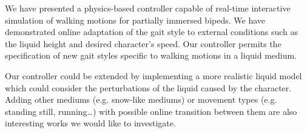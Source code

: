 \documentclass[conference]{acmsiggraph}
\begin{document}
We have presented a physics-based controller capable of real-time interactive simulation of walking motions for partially immersed bipeds. We have demonstrated online adaptation of the gait style to external conditions such as the liquid height and desired character's speed. Our controller permits the specification of new gait styles specific to walking motions in a liquid medium.

Our controller could be extended by implementing a more realistic liquid model which could consider the perturbations of the liquid caused by the character. Adding other mediums (e.g. snow-like mediums) or movement types (e.g. standing still, running…) with possible online transition between them are also interesting works we would like to investigate.




\end{document}

